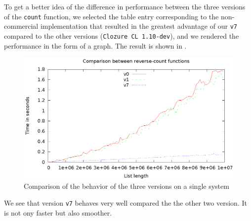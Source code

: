 To get a better idea of the difference in performance between the
three versions of the \texttt{count} function, we selected the table
entry corresponding to the non-commercial implementation that resulted
in the greatest advantage of our \texttt{v7} compared to the other
versions (\texttt{Clozure CL 1.10-dev}), and we rendered the
performance in the form of a graph.  The result is shown in
.

\begin{figure}[htb]
\centering
\includegraphics{v0-v1-v7.eps}
\caption{\label{f-versions} Comparison of the behavior of the three versions on a single system}
\end{figure}

We see that version \texttt{v7} behaves very well compared the the other two version.
It is not ony faster but also smoother.

